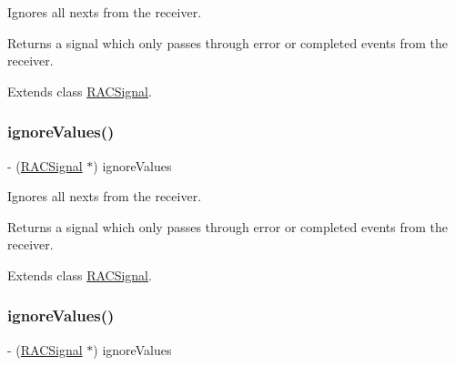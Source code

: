 Ignores all {\ttfamily next}s from the receiver.

Returns a signal which only passes through {\ttfamily error} or {\ttfamily completed} events from the receiver. 

Extends class \mbox{\hyperlink{interface_r_a_c_signal_a2997862d443d16efa3197facb6a354d1}{R\+A\+C\+Signal}}.

\mbox{\label{category_r_a_c_signal_07_operations_08_a2997862d443d16efa3197facb6a354d1}} 
\subsubsection{\texorpdfstring{ignore\+Values()}{ignoreValues()}\hspace{0.1cm}{\footnotesize\ttfamily [2/3]}}
{\footnotesize\ttfamily -\/ (\mbox{\hyperlink{interface_r_a_c_signal}{R\+A\+C\+Signal}} $\ast$) ignore\+Values \begin{DoxyParamCaption}{ }\end{DoxyParamCaption}}

Ignores all {\ttfamily next}s from the receiver.

Returns a signal which only passes through {\ttfamily error} or {\ttfamily completed} events from the receiver. 

Extends class \mbox{\hyperlink{interface_r_a_c_signal_a2997862d443d16efa3197facb6a354d1}{R\+A\+C\+Signal}}.

\mbox{\label{category_r_a_c_signal_07_operations_08_a2997862d443d16efa3197facb6a354d1}} 
\subsubsection{\texorpdfstring{ignore\+Values()}{ignoreValues()}\hspace{0.1cm}{\footnotesize\ttfamily [3/3]}}
{\footnotesize\ttfamily -\/ (\mbox{\hyperlink{interface_r_a_c_signal}{R\+A\+C\+Signal}} $\ast$) ignore\+Values \begin{DoxyParamCaption}{ }\end{DoxyParamCaption}}

